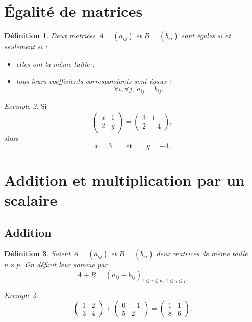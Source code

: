 \documentclass[11pt,a4paper]{article}
\newtheorem{definition}{Définition}[section]
\theoremstyle{remark}
\newtheorem{exemple}[definition]{Exemple}
\begin{document}
\section{Égalité de matrices}

\begin{definition}
Deux matrices \(A=(a_{ij})\) et \(B=(b_{ij})\) sont égales si et seulement si :
\begin{itemize}
    \item elles ont la même taille ;
    \item tous leurs coefficients correspondants sont égaux :
    \[
    \forall i,\forall j,\ a_{ij}=b_{ij}.
    \]
\end{itemize}
\end{definition}

\begin{exemple}
Si
\[
\begin{pmatrix}
x & 1\\
2 & y
\end{pmatrix}
=
\begin{pmatrix}
3 & 1\\
2 & -4
\end{pmatrix},
\]
alors
\[
x=3\qquad \text{et} \qquad y=-4.
\]
\end{exemple}

\section{Addition et multiplication par un scalaire}

\subsection{Addition}

\begin{definition}
Soient \(A=(a_{ij})\) et \(B=(b_{ij})\) deux matrices de même taille \(n\times p\).  
On définit leur somme par
\[
A+B=(a_{ij}+b_{ij})_{1\le i\le n,\ 1\le j\le p}.
\]
\end{definition}

\begin{exemple}
\[
\begin{pmatrix}
1 & 2\\
3 & 4
\end{pmatrix}
+
\begin{pmatrix}
0 & -1\\
5 & 2
\end{pmatrix}
=
\begin{pmatrix}
1 & 1\\
8 & 6
\end{pmatrix}.
\]
\end{exemple}
\end{document}
